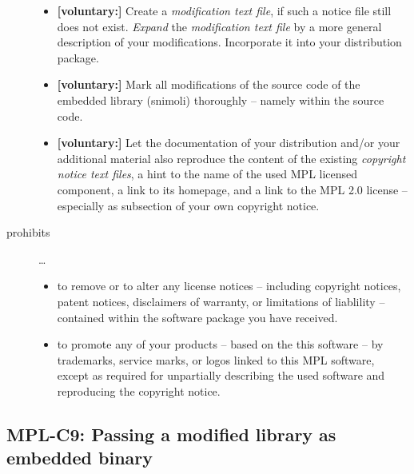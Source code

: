 \begin{description}
\begin{itemize}
  \item \textbf{[voluntary:]} Create a \emph{modification text file}, if such a
  notice file still does not exist. \emph{Expand} the \emph{modification text
  file} by a more general description of your modifications. Incorporate it into
  your distribution package.
  
  \item \textbf{[voluntary:]} Mark all modifications of the source code of the
  embedded library (snimoli) thoroughly -- namely within the source code.
      
  \item \textbf{[voluntary:]} Let the documentation of your distribution and/or
  your additional material also reproduce the content of the existing
  \emph{copyright notice text files}, a hint to the name of the used MPL
  licensed component, a link to its homepage, and a link to the MPL 2.0 license
  -- especially as subsection of your own copyright notice.
 
\end{itemize}

\item[prohibits] \ldots
\begin{itemize}
  \item to remove or to alter any license notices -- including copyright
  notices, patent notices, disclaimers of warranty, or limitations of liablility
  -- contained within the software package you have received.
  \item to promote any of your products -- based on the this software -- by
  trademarks, service marks, or logos linked to this MPL software, except as
  required for unpartially describing the used software and reproducing the
  copyright notice.
\end{itemize}

\end{description}


\subsection{MPL-C9: Passing a modified library as embedded binary}
\label{OSUC-10B-MPL}

